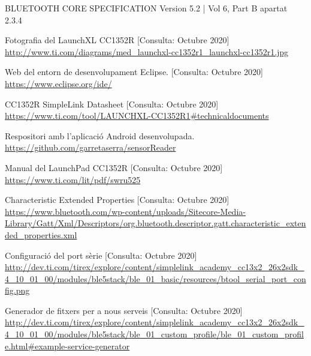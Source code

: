 \begin{thebibliography}{2}
BLUETOOTH CORE SPECIFICATION Version 5.2 | Vol 6, Part B apartat 2.3.4

Fotografia del LaunchXL CC1352R
[Consulta: Octubre 2020]\newline
\href{http://www.ti.com/diagrams/med_launchxl-cc1352r1_launchxl-cc1352r1.jpg}{http://www.ti.com/diagrams/med\_launchxl-cc1352r1\_launchxl-cc1352r1.jpg}

Web del entorn de desenvolupament Eclipse.
[Consulta: Octubre 2020] \newline
\href{https://www.eclipse.org/ide/}{https://www.eclipse.org/ide/}

CC1352R SimpleLink Datasheet
[Consulta: Octubre 2020]\newline
\href{https://www.ti.com/tool/LAUNCHXL-CC1352R1\#technicaldocuments}{https://www.ti.com/tool/LAUNCHXL-CC1352R1\#technicaldocuments}

Respositori amb l'aplicació Android desenvolupada. \newline
\href{https://github.com/garretaserra/sensorReader}{https://github.com/garretaserra/sensorReader}

Manual del LaunchPad CC1352R
[Consulta: Octubre 2020] \newline
\href{https://www.ti.com/lit/pdf/swru525}{https://www.ti.com/lit/pdf/swru525}

Characteristic Extended Properties
[Consulta: Octubre 2020]\newline
\href{https://www.bluetooth.com/wp-content/uploads/Sitecore-Media-Library/Gatt/Xml/Descriptors/org.bluetooth.descriptor.gatt.characteristic_extended_properties.xml}{https://www.bluetooth.com/wp-content/uploads/Sitecore-Media-Library/Gatt/Xml/Descriptors/org.bluetooth.descriptor.gatt.characteristic\_extended\_properties.xml}

Configuració del port sèrie
[Consulta: Octubre 2020] \newline
\href{http://dev.ti.com/tirex/explore/content/simplelink_academy_cc13x2_26x2sdk_4_10_01_00/modules/ble5stack/ble_01\_basic/resources/btool_serial_port_config.png}{http://dev.ti.com/tirex/explore/content/simplelink\_academy\_cc13x2\_26x2sdk\_4\_10\_01\_00/modules/ble5stack/ble\_01\_basic/resources/btool\_serial\_port\_config.png}

Generador de fitxers per a nous serveis 
[Consulta: Octubre 2020] \newline
\href{http://dev.ti.com/tirex/explore/content/simplelink\_academy\_cc13x2\_26x2sdk\_4\_10\_01\_00/modules/ble5stack/ble\_01\_custom\_profile/ble\_01\_custom\_profile.html\#example-service-generator}{http://dev.ti.com/tirex/explore/content/simplelink\_academy\_cc13x2\_26x2sdk\_4\_10\_01\_00/modules/ble5stack/ble\_01\_custom\_profile/ble\_01\_custom\_profile.html\#example-service-generator}


\end{thebibliography}
